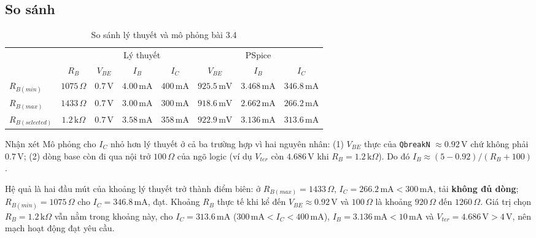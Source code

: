 \subsection{So sánh}
\begin{table}[H]
\centering
\begin{tabular}{l|c|ccc|ccc}
\toprule
 & & \multicolumn{3}{c|}{Lý thuyết} & \multicolumn{3}{c}{PSpice}\\
 & $R_B$ & $V_{BE}$ & $I_B$ & $I_C$ & $V_{BE}$ & $I_B$ & $I_C$\\
\midrule
$R_{B(min)}$      & $1075\,\Omega$ & $0.7\,\text{V}$ & $4.00\,\text{mA}$ & $400\,\text{mA}$ & $925.5\,\text{mV}$ & $3.468\,\text{mA}$ & $346.8\,\text{mA}$\\
$R_{B(max)}$      & $1433\,\Omega$ & $0.7\,\text{V}$ & $3.00\,\text{mA}$ & $300\,\text{mA}$ & $918.6\,\text{mV}$ & $2.662\,\text{mA}$ & $266.2\,\text{mA}$\\
$R_{B(selected)}$ & $1.2\,\text{k}\Omega$ & $0.7\,\text{V}$ & $3.58\,\text{mA}$ & $358\,\text{mA}$ & $922.9\,\text{mV}$ & $3.136\,\text{mA}$ & $313.6\,\text{mA}$\\
\bottomrule
\end{tabular}
\caption{So sánh lý thuyết và mô phỏng bài 3.4}
\end{table}

\begin{notebox}{Nhận xét}
Mô phỏng cho $I_C$ nhỏ hơn lý thuyết ở cả ba trường hợp vì hai nguyên nhân: (1) $V_{BE}$ thực của \texttt{QbreakN} $\approx 0.92\,\text{V}$ chứ không phải $0.7\,\text{V}$; (2) dòng base còn đi qua nội trở $100\,\Omega$ của ngõ logic (ví dụ $V_{ter}$ còn $4.686\,\text{V}$ khi $R_B = 1.2\,\text{k}\Omega$). Do đó $I_B \approx (5 - 0.92)/(R_B + 100)$.

Hệ quả là hai đầu mút của khoảng lý thuyết trở thành điểm biên: ở $R_{B(max)} = 1433\,\Omega$, $I_C = 266.2\,\text{mA} < 300\,\text{mA}$, tải \textbf{không đủ dòng}; $R_{B(min)} = 1075\,\Omega$ cho $I_C = 346.8\,\text{mA}$, đạt. Khoảng $R_B$ thực tế khi kể đến $V_{BE} \approx 0.92\,\text{V}$ và $100\,\Omega$ là khoảng $920\,\Omega$ đến $1260\,\Omega$. Giá trị chọn $R_B = 1.2\,\text{k}\Omega$ vẫn nằm trong khoảng này, cho $I_C = 313.6\,\text{mA}$ ($300\,\text{mA} < I_C < 400\,\text{mA}$), $I_B = 3.136\,\text{mA} < 10\,\text{mA}$ và $V_{ter} = 4.686\,\text{V} > 4\,\text{V}$, nên mạch hoạt động đạt yêu cầu.
\end{notebox}
